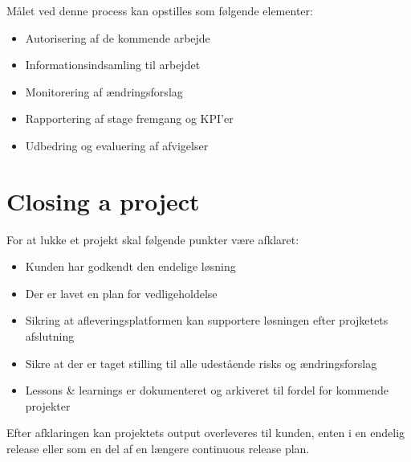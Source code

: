 Målet ved denne process kan opstilles som følgende elementer:

\begin{itemize}
    \item Autorisering af de kommende arbejde
    \item Informationsindsamling til arbejdet
    \item Monitorering af ændringsforslag
    \item Rapportering af stage fremgang og KPI'er
    \item Udbedring og evaluering af afvigelser
\end{itemize}


\section{Closing a project}

For at lukke et projekt skal følgende punkter være afklaret:

\begin{itemize}
    \item Kunden har godkendt den endelige løsning
    \item Der er lavet en plan for vedligeholdelse
    \item Sikring at afleveringsplatformen kan supportere løsningen efter projketets afslutning
    \item Sikre at der er taget stilling til alle udestående risks og ændringsforslag
    \item Lessons \& learnings er dokumenteret og arkiveret til fordel for kommende projekter
\end{itemize}

Efter afklaringen kan projektets output overleveres til kunden, enten i en endelig release eller som en del af en længere continuous release plan. 
